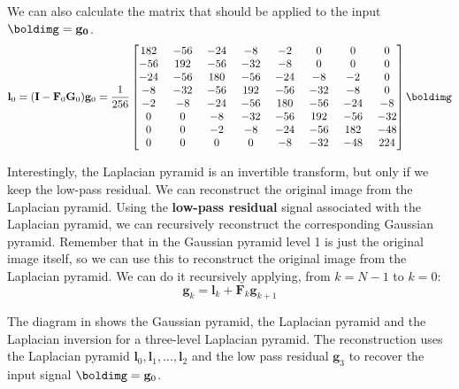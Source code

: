 We can also calculate the matrix that should be applied to the input $\boldimg=\mathbf{g_0}$.
\begin{equation}
\mathbf{l}_{0} =  (\mathbf{I} - \mathbf{F}_0 \mathbf{G}_0) \mathbf{g}_0= 
\frac{1}{256}
 \begin{bmatrix}
   182 ~& -56  ~& -24 ~&   -8   ~& -2  ~&   0  ~&   0  ~&   0\\
   -56  ~& 192  ~& -56 ~&  -32   ~& -8   ~&  0  ~&   0   ~&  0\\
   -24  ~& -56  ~& 180  ~& -56 ~&  -24  ~&  -8  ~&  -2   ~&  0\\
    -8   ~&-32  ~& -56  ~& 192  ~& -56  ~& -32  ~&  -8   ~&  0\\
    -2   ~& -8 ~&  -24  ~& -56 ~&  180 ~&  -56  ~& -24 ~&   -8\\
     0   ~&  0  ~&  -8  ~& -32 ~&  -56  ~& 192  ~& -56  ~& -32\\
     0   ~&   0  ~&  -2  ~&  -8  ~& -24  ~& -56 ~&  182  ~& -48\\
     0   ~&   0   ~&  0  ~&   0   ~& -8  ~& -32 ~&  -48 ~&  224
\end{bmatrix}
\boldimg
\end{equation}





Interestingly, the Laplacian pyramid is an invertible transform, but only if we keep the low-pass residual.  We can reconstruct the original image from the Laplacian pyramid. Using the {\bf low-pass residual} signal associated with the Laplacian
pyramid, we can recursively reconstruct the corresponding Gaussian pyramid.  Remember that in the Gaussian pyramid level 1 is just the original image itself, so we can use this to reconstruct the original image
from the Laplacian pyramid. We can do it recursively applying, from $k=N-1$ to $k=0$:
\begin{equation}
\mathbf{g}_k = \mathbf{l}_k + \mathbf{F}_k \mathbf{g}_{k+1}
\label{eq:laplaceRecursion}
\end{equation}

The diagram in \fig{\ref{fig:laplacian_pyr_architecture}} shows the Gaussian pyramid, the Laplacian pyramid and the Laplacian inversion for a three-level Laplacian pyramid. The reconstruction uses the Laplacian pyramid $\mathbf{l}_0,\mathbf{l}_1,...,\mathbf{l}_2$ and the low pass residual $\mathbf{g}_3$ to recover the input signal $\boldimg=\mathbf{g}_0$.


